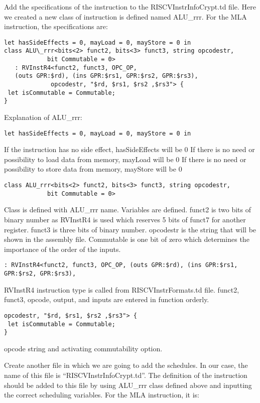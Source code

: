 Add the specifications of the instruction to the RISCVInstrInfoCrypt.td file. Here we created a new class of instruction is defined named ALU\_rrr. For the MLA instruction, the specifications are:

\begin{lstlisting}
let hasSideEffects = 0, mayLoad = 0, mayStore = 0 in
class ALU\_rrr<bits<2> funct2, bits<3> funct3, string opcodestr,
            bit Commutable = 0>
   : RVInstR4<funct2, funct3, OPC_OP, 
   (outs GPR:$rd), (ins GPR:$rs1, GPR:$rs2, GPR:$rs3),
             opcodestr, "$rd, $rs1, $rs2 ,$rs3"> {
 let isCommutable = Commutable;
}
\end{lstlisting}
Explanation of ALU\_rrr:
\begin{lstlisting}
let hasSideEffects = 0, mayLoad = 0, mayStore = 0 in
\end{lstlisting}

If the instruction has no side effect, hasSideEffects will be 0
If there is no need or possibility to load data from memory, mayLoad will be 0
If there is no need or possibility to store data from memory, mayStore will be 0


\begin{lstlisting}
class ALU_rrr<bits<2> funct2, bits<3> funct3, string opcodestr,
            bit Commutable = 0>
\end{lstlisting}

Class is defined with ALU\_rrr name. Variables are defined. funct2 is two bits of binary number as RVInstR4 is used which reserves 5 bits of funct7 for another register. funct3 is three bits of binary number. opcodestr is the string that will be shown in the assembly file. Commutable is one bit of zero which determines the importance of the order of the inputs.


\begin{lstlisting}
: RVInstR4<funct2, funct3, OPC_OP, (outs GPR:$rd), (ins GPR:$rs1, GPR:$rs2, GPR:$rs3),
\end{lstlisting}

RVInstR4 instruction type is called from RISCVInstrFormats.td file. funct2, funct3, opcode, output, and inputs are entered in function orderly.

\begin{lstlisting}
opcodestr, "$rd, $rs1, $rs2 ,$rs3"> {
 let isCommutable = Commutable;
}
\end{lstlisting}

opcode string and activating commutability option.

Create another file in which we are going to add the schedules. In our case, the name of this file is “RISCVInstrInfoCrypt.td”. The definition of the instruction should be added to this file by using ALU\_rrr class defined above and inputting the correct scheduling variables. For the MLA instruction, it is:


